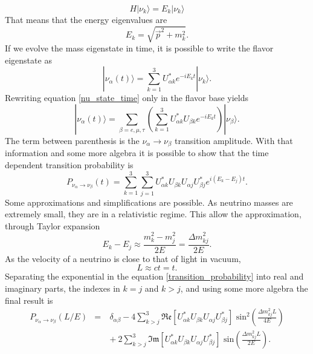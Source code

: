 %
\begin{equation}
	H|\nu_k \rangle = E_k |\nu_k \rangle
	\label{nu_schrodinger}
\end{equation}
%
That means that the energy eigenvalues are
%
\begin{equation}
	E_k = \sqrt{\vec{p}^2 + m_k^2}.
	\label{nu_energy}
\end{equation}
%
If we evolve the mass eigenstate in time, it is possible to write the flavor eigenstate as
%
\begin{equation}
	|\nu_\alpha (t) \rangle = \sum_{k=1}^3 U^*_{\alpha k} e^{-iE_kt}|\nu_k \rangle.
	\label{nu_state_time}
\end{equation}
%
Rewriting equation \ref{nu_state_time} only in the flavor base yields 
%
\begin{equation}
	|\nu_\alpha (t)\rangle = \sum_{\beta = e, \mu, \tau} \left( \sum_{k=1}^3 U^*_{\alpha k} U_{\beta k} e^{-iE_kt} \right) |\nu_\beta \rangle.
	\label{nu_state_time_2}
\end{equation}
%
The term between parenthesis is the $\nu_\alpha \rightarrow \nu_\beta$ transition amplitude. With that information and some more algebra it is possible to show that the time dependent transition probability is
%
\begin{equation}
	P_{\nu_\alpha \rightarrow \nu_\beta}(t) = \sum_{k=1}^3 \sum_{j=1}^3 U^*_{\alpha k} U_{\beta k} U_{\alpha j} U^*_{\beta j} e^{i(E_k - E_j)t}.
	\label{transition_probability}
\end{equation}
%
Some approximations and simplifications are possible. As neutrino masses are extremely small, they are in a relativistic regime. This allow the approximation, through Taylor expansion 
%
\begin{equation}
	E_k - E_j \approx \frac{m^2_k - m^2_j}{2E} = \frac{\Delta m^2_{kj}}{2E}.
	\label{nu_Ej-Ek}
\end{equation}
%
As the velocity of a neutrino is close to that of light in vacuum,
%
\begin{equation}
	L \approx ct = t.
	\label{nu_L}
\end{equation}
%
Separating the exponential in the equation \ref{transition_probability} into real and imaginary parts, the indexes in $k=j$ and $k>j$, and using some more algebra the final result is
%
\begin{eqnarray}
	P_{\nu_\alpha \rightarrow \nu_\beta} (L/E) & = & \delta_{\alpha\beta} - 4\sum_{k>j}^3  \mathfrak{Re}[U^*_{\alpha k} U_{\beta k} U_{\alpha j} U^*_{\beta j}]\text{ sin}^2\left(\frac{\Delta m^2_{kj} L}{4E} \right) \nonumber \\
	& \quad & + \ 2\sum_{k>j}^3\mathfrak{Im}[U^*_{\alpha k} U_{\beta k} U_{\alpha j} U^*_{\beta j}]\text{ sin}\left(\frac{\Delta m^2_{kj} L}{2E} \right).
	\label{nu_oscillation_final}
\end{eqnarray}
%

